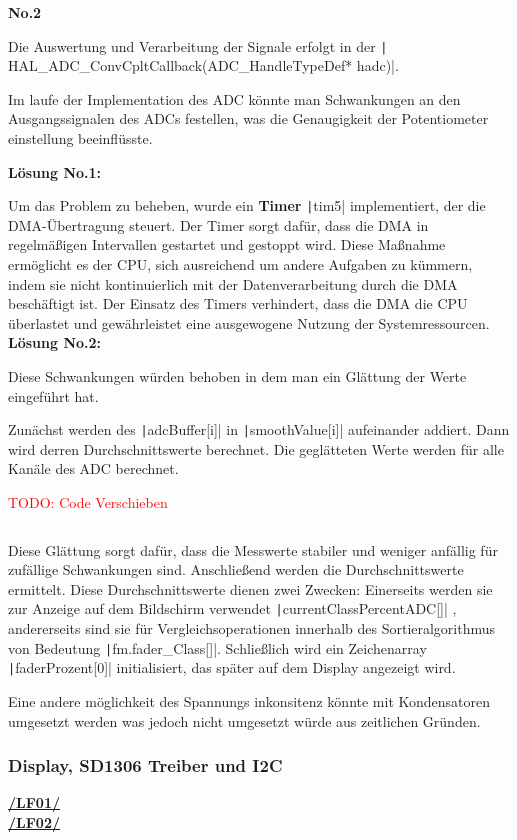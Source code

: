 \textbf{No.2}

Die Auswertung und Verarbeitung der Signale erfolgt in der \texttt| HAL_ADC_ConvCpltCallback(ADC_HandleTypeDef* hadc)|.

Im laufe der Implementation des ADC könnte man Schwankungen an den Ausgangssignalen des ADCs festellen, was die Genaugigkeit der Potentiometer einstellung beeinflüsste. 

\textbf{Lösung No.1:}

Um das Problem zu beheben, wurde ein \textbf{Timer} \texttt|tim5| implementiert, der die DMA-Übertragung steuert. Der Timer sorgt dafür, dass die DMA in regelmäßigen Intervallen gestartet und gestoppt wird. Diese Maßnahme ermöglicht es der CPU, sich ausreichend um andere Aufgaben zu kümmern, indem sie nicht kontinuierlich mit der Datenverarbeitung durch die DMA beschäftigt ist. Der Einsatz des Timers verhindert, dass die DMA die CPU überlastet und gewährleistet eine ausgewogene Nutzung der Systemressourcen. \\

\newpage
\textbf{Lösung No.2:}

Diese Schwankungen würden behoben in dem man ein Glättung der Werte eingeführt hat.

Zunächst werden des \texttt|adcBuffer[i]| in \texttt|smoothValue[i]| aufeinander addiert. Dann wird derren Durchschnittswerte berechnet. Die geglätteten Werte werden für alle Kanäle des ADC berechnet. 

\textcolor{red}{TODO: Code Verschieben}

 \inputminted[firstline=142, lastline=156]{c}{../../f401_display_encoder_fader_test/Core/Src/interface.c}

Diese Glättung sorgt dafür, dass die Messwerte stabiler und weniger anfällig für zufällige Schwankungen sind. Anschließend werden die Durchschnittswerte ermittelt. Diese Durchschnittswerte dienen zwei Zwecken: Einerseits werden sie zur Anzeige auf dem Bildschirm verwendet  \texttt|currentClassPercentADC[]|
, andererseits sind sie für Vergleichsoperationen innerhalb des Sortieralgorithmus von Bedeutung  \texttt|fm.fader_Class[]|.
 Schließlich wird ein Zeichenarray \texttt|faderProzent[0]| initialisiert, das später auf dem Display angezeigt wird. 
 
Eine andere möglichkeit des Spannungs inkonsitenz könnte mit Kondensatoren umgesetzt werden was jedoch nicht umgesetzt würde aus zeitlichen Gründen.

\newpage
\subsubsection{Display, SD1306 Treiber und I2C}
\textbf{\hyperlink{LF01_Link}{/LF01/}} \\
\textbf{\hyperlink{LF02_Link}{/LF02/}} \\


